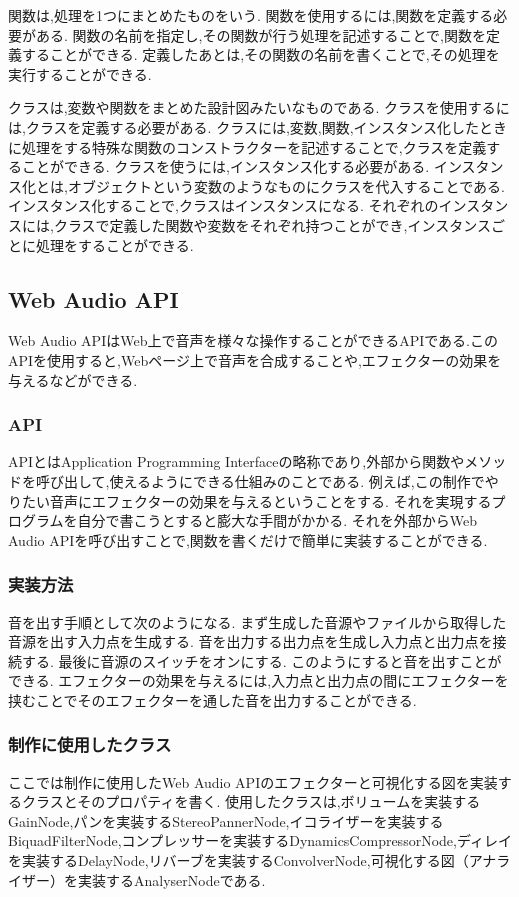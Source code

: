 \documentclass[12pt,a4j,titlepage]{ltjsarticle}
\begin{document}
関数は,処理を1つにまとめたものをいう.
関数を使用するには,関数を定義する必要がある.
関数の名前を指定し,その関数が行う処理を記述することで,関数を定義することができる.
定義したあとは,その関数の名前を書くことで,その処理を実行することができる.

クラスは,変数や関数をまとめた設計図みたいなものである.
クラスを使用するには,クラスを定義する必要がある.
クラスには,変数,関数,インスタンス化したときに処理をする特殊な関数のコンストラクターを記述することで,クラスを定義することができる.
クラスを使うには,インスタンス化する必要がある.
インスタンス化とは,オブジェクトという変数のようなものにクラスを代入することである.
インスタンス化することで,クラスはインスタンスになる.
それぞれのインスタンスには,クラスで定義した関数や変数をそれぞれ持つことができ,インスタンスごとに処理をすることができる.

\subsection{Web Audio API}
Web Audio APIはWeb上で音声を様々な操作することができるAPIである.このAPIを使用すると,Webページ上で音声を合成することや,エフェクターの効果を与えるなどができる.

\subsubsection{API}
APIとはApplication Programming Interfaceの略称であり,外部から関数やメソッドを呼び出して,使えるようにできる仕組みのことである\cite{api}.
例えば,この制作でやりたい音声にエフェクターの効果を与えるということをする.
それを実現するプログラムを自分で書こうとすると膨大な手間がかかる.
それを外部からWeb Audio APIを呼び出すことで,関数を書くだけで簡単に実装することができる.

\subsubsection{実装方法}
音を出す手順として次のようになる.
まず生成した音源やファイルから取得した音源を出す入力点を生成する.
音を出力する出力点を生成し入力点と出力点を接続する.
最後に音源のスイッチをオンにする.
このようにすると音を出すことができる.
エフェクターの効果を与えるには,入力点と出力点の間にエフェクターを挟むことでそのエフェクターを通した音を出力することができる.

\subsubsection{制作に使用したクラス}
ここでは制作に使用したWeb Audio APIのエフェクターと可視化する図を実装するクラスとそのプロパティを書く.
使用したクラスは,ボリュームを実装するGainNode,パンを実装するStereoPannerNode,イコライザーを実装するBiquadFilterNode,コンプレッサーを実装するDynamicsCompressorNode,ディレイを実装するDelayNode,リバーブを実装するConvolverNode,可視化する図（アナライザー）を実装するAnalyserNodeである.
\end{document}
